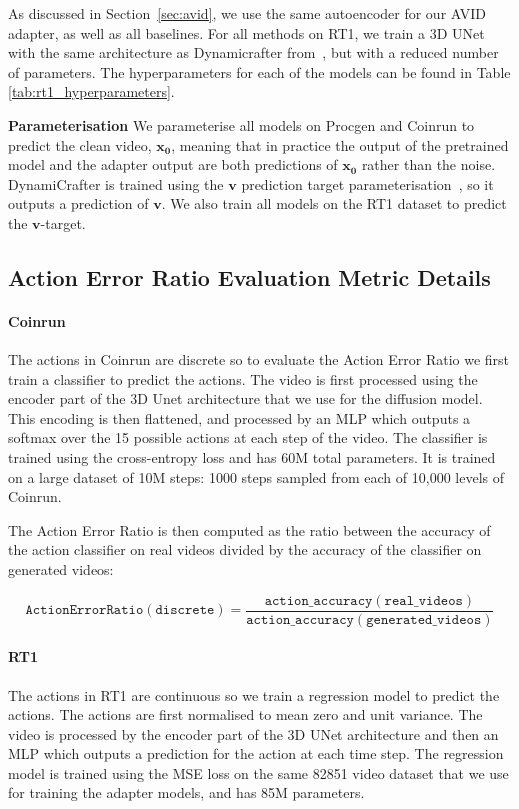 As discussed in Section~\ref{sec:avid}, we
 use the same autoencoder for our AVID adapter, as well as all baselines.
%
For all methods on RT1, we train a 3D UNet with the same architecture as Dynamicrafter from~\citep{chen2023videocrafter1}, but with a reduced number of parameters. 
%
The hyperparameters for each of the models can be found in Table \ref{tab:rt1_hyperparameters}.


\textbf{Parameterisation} We parameterise all models on Procgen and Coinrun to predict the clean video, $\mathbf{x_0}$, meaning that in practice the output of the pretrained model and the adapter output are both predictions of $\mathbf{x_0}$ rather than the noise. DynamiCrafter is trained using the $\mathbf{v}$ prediction target parameterisation~\citep{salimans2022progressive}, so it outputs a prediction of $\mathbf{v}$. We also train all models on the RT1 dataset to predict the $\mathbf{v}$-target. 

\subsection{Action Error Ratio Evaluation Metric Details}
\label{sec:metric_details}

\paragraph{Coinrun} The actions in Coinrun are discrete so to evaluate the Action Error Ratio we first train a classifier to predict the actions. The video is first processed using the encoder part of the 3D Unet architecture that we use for the diffusion model. This encoding is then flattened, and processed by an MLP which outputs a softmax over the 15 possible actions at each step of the video. The classifier is trained using the cross-entropy loss and has 60M total parameters. It is trained on a large dataset of 10M steps: 1000 steps sampled from each of 10,000 levels of Coinrun.

The Action Error Ratio is then computed as the ratio between the accuracy of the action classifier on real videos divided by the accuracy of the classifier on generated videos:

$$
\mathtt{Action Error Ratio (discrete)} = \frac{\mathtt{action\_accuracy(real\_videos)}}{\mathtt{action\_accuracy(generated\_videos)}}
$$

\paragraph{RT1} The actions in RT1 are continuous so we train a regression model to predict the actions. The actions are first normalised to mean zero and unit variance. The video is processed by the encoder part of the 3D UNet architecture and then an MLP which outputs a prediction for the action at each time step. The regression model is trained using the MSE loss on the same 82851 video dataset that we use for training the adapter models, and has 85M parameters.

